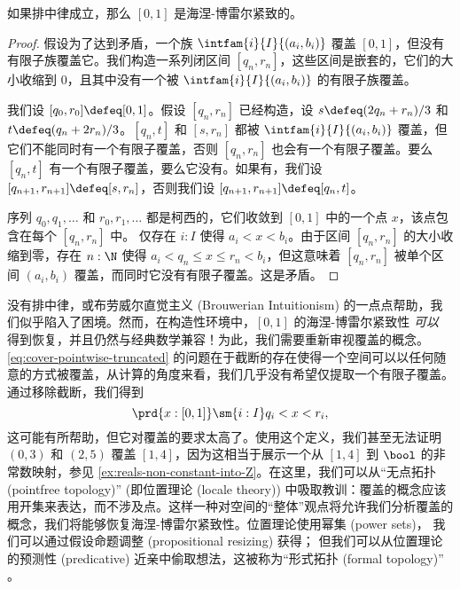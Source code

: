 \begin{thm} \label{classical-Heine-Borel}
%
如果排中律成立，那么 $[0,1]$ 是海涅-博雷尔紧致的。
\end{thm}

\begin{proof}
  假设为了达到矛盾，一个族 $\intfam{i}{I}{(a_i, b_i)}$ 覆盖 $[0,1]$，但没有有限子族覆盖它。我们构造一系列闭区间 $[q_n, r_n]$，这些区间是嵌套的，它们的大小收缩到 $0$，且其中没有一个被 $\intfam{i}{I}{(a_i, b_i)}$ 的有限子族覆盖。

  我们设 $[q_0, r_0] \defeq [0,1]$。假设 $[q_n, r_n]$ 已经构造，设 $s \defeq (2 q_n + r_n)/3$ 和 $t \defeq (q_n + 2 r_n)/3$。$[q_n, t]$ 和 $[s, r_n]$ 都被 $\intfam{i}{I}{(a_i, b_i)}$ 覆盖，但它们不能同时有一个有限子覆盖，否则 $[q_n, r_n]$ 也会有一个有限子覆盖。要么 $[q_n, t]$ 有一个有限子覆盖，要么它没有。如果有，我们设 $[q_{n+1}, r_{n+1}] \defeq [s, r_n]$，否则我们设 $[q_{n+1}, r_{n+1}] \defeq [q_n, t]$。

  序列 $q_0, q_1, \ldots$ 和 $r_0, r_1, \ldots$ 都是柯西的，它们收敛到 $[0,1]$ 中的一个点 $x$，该点包含在每个 $[q_n, r_n]$ 中。
  仅存在 $i : I$ 使得 $a_i < x < b_i$。由于区间 $[q_n, r_n]$ 的大小收缩到零，存在 $n : \N$ 使得 $a_i < q_n \leq x \leq r_n < b_i$，但这意味着 $[q_n, r_n]$ 被单个区间 $(a_i, b_i)$ 覆盖，而同时它没有有限子覆盖。这是矛盾。
\end{proof}

没有排中律，或布劳威尔直觉主义 (Brouwerian Intuitionism) 的一点点帮助，我们似乎陷入了困境。然而，在构造性环境中，$[0,1]$ 的海涅-博雷尔紧致性 \emph{可以} 得到恢复，并且仍然与经典数学兼容！为此，我们需要重新审视覆盖的概念。\eqref{eq:cover-pointwise-truncated} 的问题在于截断的存在使得一个空间可以以任何随意的方式被覆盖，从计算的角度来看，我们几乎没有希望仅提取一个有限子覆盖。通过移除截断，我们得到
%
\begin{equation} \label{eq:cover-pointwise}
\prd{x : [0,1]} \sm{i : I} q_i < x < r_i,
\end{equation}
%
这可能有所帮助，但它对覆盖的要求太高了。使用这个定义，我们甚至无法证明 $(0,3)$ 和 $(2,5)$ 覆盖 $[1,4]$，因为这相当于展示一个从 $[1,4]$ 到 $\bool$ 的非常数映射，参见 \cref{ex:reals-non-constant-into-Z}。在这里，我们可以从“无点拓扑 (pointfree topology)”%
%
(即位置理论 (locale theory))%
中吸取教训：覆盖的概念应该用开集来表达，而不涉及点。这样一种对空间的“整体”观点将允许我们分析覆盖的概念，我们将能够恢复海涅-博雷尔紧致性。位置理论使用幂集 (power sets)，%
我们可以通过假设命题调整 (propositional resizing) 获得；%
但我们可以从位置理论的预测性 (predicative) 近亲中偷取想法，这被称为“形式拓扑 (formal topology)”%
。

